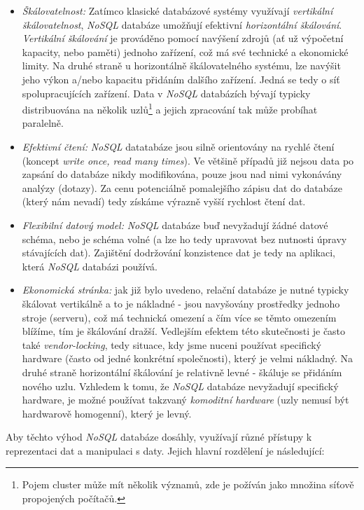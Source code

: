 \begin{itemize}
  \item{\textit{Škálovatelnost:}} Zatímco klasické databázové systémy využívají \textit{vertikální škálovatelnost}, \textit{NoSQL} databáze umožňují efektivní \textit{horizontální škálování}. \textit{Vertikální škálování} je prováděno pomocí navýšení zdrojů (ať už výpočetní kapacity, nebo paměti) jednoho zařízení, což má své technické a ekonomické limity. Na druhé straně u horizontálně škálovatelného systému, lze navýšit jeho výkon a/nebo kapacitu přidáním dalšího zařízení. Jedná se tedy o síť spolupracujících zařízení. Data v \textit{NoSQL} databázích bývají typicky distribuována na několik uzlů\footnote{Pojem cluster může mít několik významů, zde je požíván jako množina síťově propojených počítačů.} a jejich zpracování tak může probíhat paralelně.
  \item{\textit{Efektivní čtení:}} \textit{NoSQL} datatabáze jsou silně orientovány na rychlé čtení (koncept \textit{write once, read many times}). Ve většině případů již nejsou data po zapsání do databáze nikdy modifikována, pouze jsou nad nimi vykonávány analýzy (dotazy). Za cenu potenciálně pomalejšího zápisu dat do databáze (který nám nevadí) tedy získáme výrazně vyšší rychlost čtení dat.
  \item{\textit{Flexibilní datový model:}} \textit{NoSQL} databáze buď nevyžadují žádné datové schéma, nebo je schéma volné (a lze ho tedy upravovat bez nutnosti úpravy stávajících dat). Zajištění dodržování konzistence dat je tedy na aplikaci, která \textit{NoSQL} databázi používá.
  \item{\textit{Ekonomická stránka:}} jak již bylo uvedeno, relační databáze je nutné typicky škálovat vertikálně a to je nákladné - jsou navyšovány prostředky jednoho stroje (serveru), což má technická omezení a čím více se těmto omezením blížíme, tím je škálování dražší. Vedlejším efektem této skutečnosti je často také \textit{vendor-locking}, tedy situace, kdy jsme nuceni používat specifický hardware (často od jedné konkrétní společnosti), který je velmi nákladný. Na druhé straně horizontální škálování je relativně levné - škáluje se přidáním nového uzlu. Vzhledem k tomu, že \textit{NoSQL} databáze nevyžadují specifický hardware, je možné používat takzvaný \textit{komoditní hardware} (uzly nemusí být hardwarově homogenní), který je levný.
\end{itemize}

Aby těchto výhod \textit{NoSQL} databáze dosáhly, využívají různé přístupy k reprezentaci dat a manipulaci s daty. Jejich hlavní rozdělení je následující:

